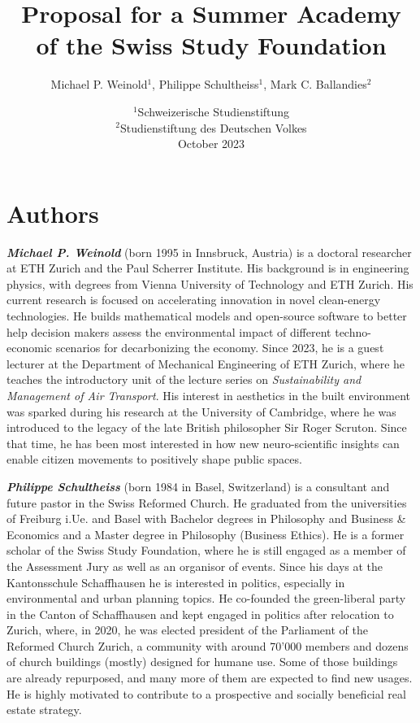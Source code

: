 \documentclass{article}
\title{Proposal for a Summer Academy \protect\\ of the Swiss Study Foundation}
\author{Michael P. Weinold$^1$, Philippe Schultheiss$^1$, Mark C. Ballandies$^2$}
\date{
    $^1$Schweizerische Studienstiftung \\
    $^2$Studienstiftung des Deutschen Volkes \\[3mm]
    October 2023
}
\begin{document}
\maketitle

\section*{\centering Authors}

\textbf{\textit{Michael P. Weinold}} (born 1995 in Innsbruck, Austria) is a doctoral researcher at ETH Zurich and the Paul Scherrer Institute. His background is in engineering physics, with degrees from Vienna University of Technology and ETH Zurich. His current research is focused on accelerating innovation in novel clean-energy technologies. He builds mathematical models and open-source software to better help decision makers assess the environmental impact of different techno-economic scenarios for decarbonizing the economy. Since 2023, he is a guest lecturer at the Department of Mechanical Engineering of ETH Zurich, where he teaches the introductory unit of the lecture series on \textit{Sustainability and Management of Air Transport}. His interest in aesthetics in the built environment was sparked during his research at the University of Cambridge, where he was introduced to the legacy of the late British philosopher Sir Roger Scruton. Since that time, he has been most interested in how new neuro-scientific insights can enable citizen movements to positively shape public spaces.

\textbf{\textit{Philippe Schultheiss}} (born 1984 in Basel, Switzerland) is a consultant and future pastor in the Swiss Reformed Church. He graduated from the universities of Freiburg i.Ue. and Basel with Bachelor degrees in Philosophy and Business \& Economics and a Master degree in Philosophy (Business Ethics). He is a former scholar of the Swiss Study Foundation, where he is still engaged as a member of the Assessment
Jury as well as an organisor of events. Since his days at the Kantonsschule Schaffhausen he is interested in politics, especially in environmental and urban planning topics. He co-founded the green-liberal party in the Canton of Schaffhausen and kept engaged in politics after relocation to Zurich, where, in 2020, he was elected president of the Parliament of the Reformed Church Zurich, a community with around 70'000
members and dozens of church buildings (mostly) designed for humane use. Some of those buildings are already repurposed, and many more of them are expected to find new usages. He is highly motivated to contribute to a prospective and socially beneficial real estate strategy.
\end{document}
